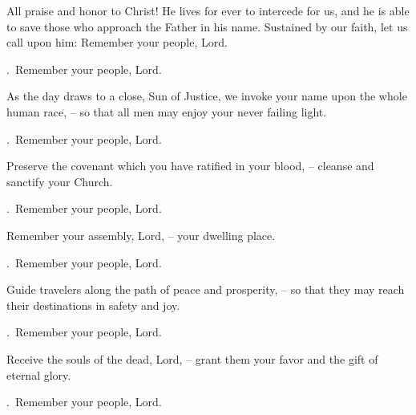 \lettrine[loversize=0.15,lines=2]{A}{}ll praise and honor to Christ! He lives for ever to intercede for us, and he is able to save those who approach the Father in his name. Sustained by our faith, let us call upon him:
Remember your people, Lord.

\par \Rbar.~Remember your people, Lord.

As the day draws to a close, Sun of Justice, we invoke your name upon the whole human race,
– so that all men may enjoy your never failing light.

\par \Rbar.~Remember your people, Lord.

Preserve the covenant which you have ratified in your blood,
– cleanse and sanctify your Church.
\par \Rbar.~Remember your people, Lord.

Remember your assembly, Lord,
– your dwelling place.
\par \Rbar.~Remember your people, Lord.

Guide travelers along the path of peace and prosperity,
– so that they may reach their destinations in safety and joy.
\par \Rbar.~Remember your people, Lord.

Receive the souls of the dead, Lord,
– grant them your favor and the gift of eternal glory.
\par \Rbar.~Remember your people, Lord.
